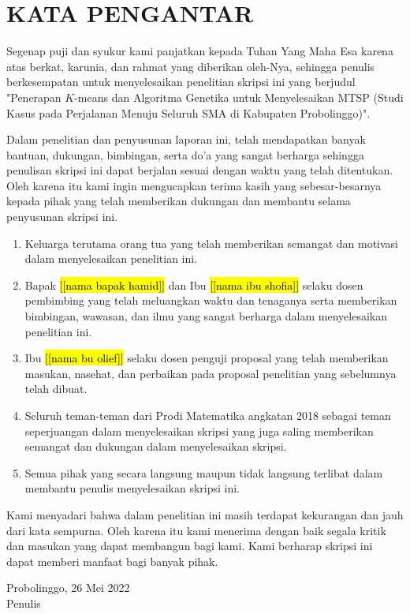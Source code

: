 \newpage
\chapter*{KATA PENGANTAR}

Segenap puji dan syukur kami panjatkan kepada Tuhan Yang Maha Esa karena atas berkat, karunia, dan rahmat yang diberikan oleh-Nya, sehingga penulis berkesempatan untuk menyelesaikan penelitian skripsi ini yang berjudul "Penerapan $K$-means dan Algoritma Genetika untuk Menyelesaikan MTSP (Studi Kasus pada Perjalanan Menuju Seluruh SMA di Kabupaten Probolinggo)".

Dalam penelitian dan penyusunan laporan ini, telah mendapatkan banyak bantuan, dukungan, bimbingan, serta do'a yang sangat berharga sehingga penulisan skripsi ini dapat berjalan sesuai dengan waktu yang telah ditentukan.
Oleh karena itu kami ingin mengucapkan terima kasih yang sebesar-besarnya kepada pihak yang telah memberikan dukungan dan membantu selama penyusunan skripsi ini.

\begin{enumerate}
	\item Keluarga terutama orang tua yang telah memberikan semangat dan motivasi dalam menyelesaikan penelitian ini.
	\item Bapak \hl{[[nama bapak hamid]]} dan Ibu \hl{[[nama ibu shofia]]} selaku dosen pembimbing yang telah meluangkan waktu dan tenaganya serta memberikan bimbingan, wawasan, dan ilmu yang sangat berharga dalam menyelesaikan penelitian ini.
	\item Ibu \hl{[[nama bu olief]]} selaku dosen penguji proposal yang telah memberikan masukan, nasehat, dan perbaikan pada proposal penelitian yang sebelumnya telah dibuat.
	\item Seluruh teman-teman dari Prodi Matematika angkatan 2018 sebagai teman seperjuangan dalam menyelesaikan skripsi yang juga saling memberikan semangat dan dukungan dalam menyelesaikan skripsi.
	\item Semua pihak yang secara langsung maupun tidak langsung terlibat dalam membantu penulis menyelesaikan skripsi ini.
\end{enumerate}

Kami menyadari bahwa dalam penelitian ini masih terdapat kekurangan dan jauh dari kata sempurna. Oleh karena itu kami menerima dengan baik segala kritik dan masukan yang dapat membangun bagi kami. Kami berharap skripsi ini dapat memberi manfaat bagi banyak pihak.

\begin{flushright}
Probolinggo, 26 Mei 2022\\
Penulis
\end{flushright}